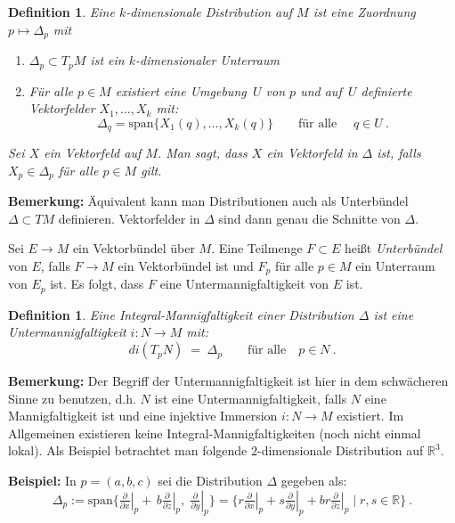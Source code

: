 \documentclass[12pt,a4paper]{article}
\def\R{\mathbb{R}}
\newtheorem{Definition}[Lemma]{Definition}
\begin{document}
\begin{Definition}
Eine $k$-dimensionale {\em Distribution} auf $M$ ist eine Zuordnung $p\mapsto \Delta_p$ mit
\begin{enumerate}
\item
$\Delta_p \subset T_p M$ ist ein $k$-dimensionaler Unterraum
\item
F\"ur alle $p\in M$ existiert eine Umgebung $\,U$ von $p$ und auf $\,U$ definierte Vektorfelder
$X_1,\ldots, X_k $ mit:
$$
\Delta_q = \mathrm{span} \{X_1(q),\ldots, X_k(q)\} \qquad \mbox{f\"ur alle }\quad q \in U \ .
$$
\end{enumerate}

Sei $X$ ein Vektorfeld auf $M$. Man sagt, dass $X$ ein Vektorfeld in $\Delta$ ist, falls
$X_p \in \Delta_p$ f\"ur alle $p\in M$ gilt.
\end{Definition}

{\bf Bemerkung:} \"Aquivalent kann man Distributionen auch als Unterb\"undel  $\Delta \subset TM$
definieren. Vektorfelder in $\Delta$ sind dann genau die Schnitte von $\Delta$.

\medskip

Sei $E\rightarrow M$ ein Vektorb\"undel \"uber $M$. Eine Teilmenge $F\subset E$ hei\ss t
{\it Unterb\"undel} von $E$, falls $F\rightarrow M$ ein Vektorb\"undel ist und
$F_p$ f\"ur alle $p \in M$ ein Unterraum von $E_p$ ist. Es folgt, dass $F$ eine Untermannigfaltigkeit
von $E$ ist.

\bigskip

\begin{Definition}
Eine {\em Integral-Mannigfaltigkeit} einer Distribution $\Delta$ ist eine Untermannigfaltigkeit
$i: N \rightarrow M$ mit:
$$
di (T_pN) \;=\; \Delta_p \qquad \mbox{f\"ur alle} \quad p \in N \ .
$$
\end{Definition}

\bigskip

{\bf Bemerkung:}
Der Begriff der Untermannigfaltigkeit ist hier in dem schw\"acheren Sinne zu benutzen, d.h. $N$ ist
eine Untermannigfaltigkeit, falls $N$ eine Mannigfaltigkeit ist und eine injektive Immersion
$i:N \rightarrow M$ existiert.
Im Allgemeinen existieren keine Integral-Mannigfaltigkeiten (noch nicht
einmal lokal). Als Beispiel betrachtet man folgende $2$-dimensionale Distribution auf $\R^3$.

\bigskip


{\bf Beispiel:} In $p=(a,b,c)$ sei die Distribution $\Delta$ gegeben als:
$$
\Delta_p := \mathrm{span} \{
\left. \tfrac{\partial }{\partial x}\right|_p + \, b \left. \tfrac{\partial }{\partial z}\right|_p,\;
\left. \tfrac{\partial }{\partial y}\right|_p    \}
=
\{r \left. \tfrac{\partial }{\partial x}\right|_p   + s\left. \tfrac{\partial }{\partial y}\right|_p
+ br \left. \tfrac{\partial }{\partial z}\right|_p  \;|\; r,s \in \R   \} \ .
$$
\end{document}
